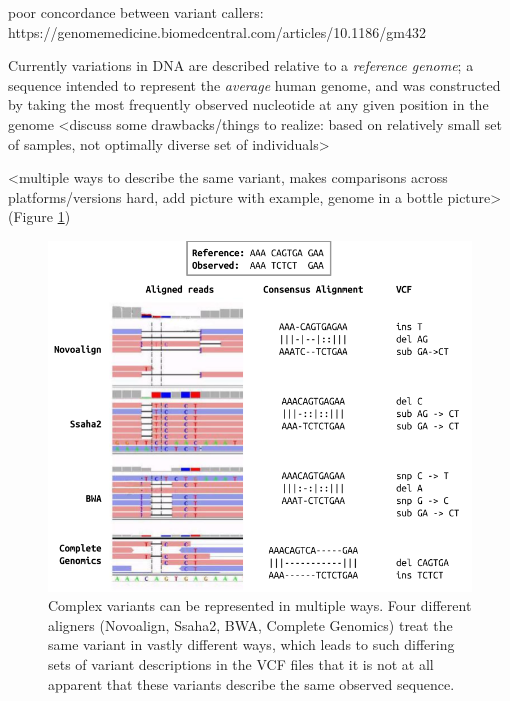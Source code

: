 poor concordance between variant callers: https://genomemedicine.biomedcentral.com/articles/10.1186/gm432


Currently variations in DNA are described relative to a \emph{reference genome}; a sequence intended to represent the \emph{average} human genome, and was constructed by taking the most frequently observed nucleotide at any given  position in the genome
<discuss some drawbacks/things to realize: based on relatively small set of samples, not optimally diverse set of individuals>

<multiple ways to describe the same variant, makes comparisons across platforms/versions hard, add picture with example, genome in a bottle picture> \cite{zook2014integrating} (Figure \ref{fig:variant-multiple-representations})


\begin{figure}[h!]
    \centering
    \includegraphics[width=400pt]{chapters/images/variant-representation-all.png}

    \caption{Complex variants can be represented in multiple ways. Four different aligners (Novoalign, Ssaha2, BWA, Complete Genomics) treat the same variant in vastly different ways, which leads to such differing sets of variant descriptions in the VCF files that it is not at all apparent that these variants describe the same observed sequence.}
    \label{fig:variant-multiple-representations}
\end{figure}


